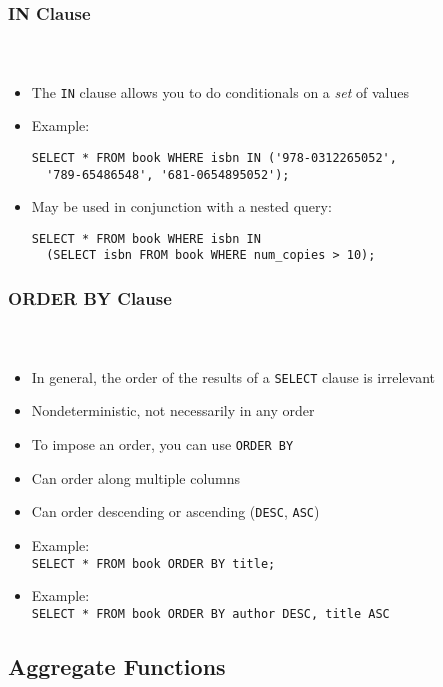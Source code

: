 \documentclass{beamer}
\begin{document}
\begin{frame}[fragile]
  \frametitle{IN Clause}
  \framesubtitle{~}

\begin{itemize}
  \item The \texttt{IN} clause allows you to do conditionals on a \emph{set} of values
  \item Example:\\
\begin{verbatim}
SELECT * FROM book WHERE isbn IN ('978-0312265052', 
  '789-65486548', '681-0654895052');
\end{verbatim}
  \item May be used in conjunction with a nested query:
\begin{verbatim}
SELECT * FROM book WHERE isbn IN 
  (SELECT isbn FROM book WHERE num_copies > 10);
\end{verbatim}
\end{itemize}

\end{frame}

\begin{frame}[fragile]
  \frametitle{ORDER BY Clause}
  \framesubtitle{~}

\begin{itemize}
  \item In general, the order of the results of a \texttt{SELECT} clause is irrelevant
  \item Nondeterministic, not necessarily in any order
  \item To impose an order, you can use \texttt{ORDER BY}
  \item Can order along multiple columns
  \item Can order descending or ascending (\texttt{DESC}, \texttt{ASC})
  \item Example:\\
	\texttt{SELECT * FROM book ORDER BY title;}
  \item Example:\\
	\texttt{SELECT * FROM book ORDER BY author DESC, title ASC}
\end{itemize}

\end{frame}

\subsection{Aggregate Functions}
\end{document}
